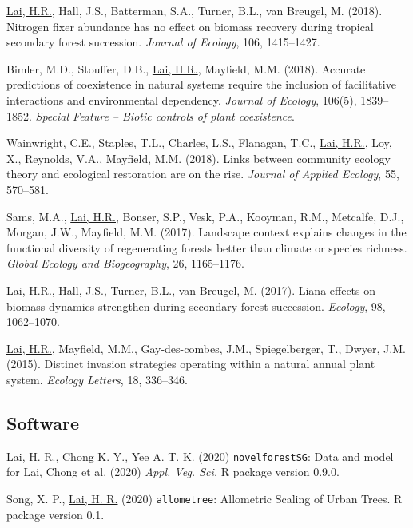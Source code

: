 \documentclass[a4paper]{article}
\begin{document}
\hangindent=1cm \underline{Lai, H.R.}, Hall, J.S., Batterman, S.A., Turner, B.L., van Breugel, M. (2018). Nitrogen fixer abundance has no effect on biomass recovery during tropical secondary forest succession. \textit{Journal of Ecology}, 106, 1415--1427.

\hangindent=1cm Bimler, M.D., Stouffer, D.B., \underline{Lai, H.R.}, Mayfield, M.M. (2018). Accurate predictions of coexistence in natural systems require the inclusion of facilitative interactions and environmental dependency. \textit{Journal of Ecology}, 106(5), 1839--1852. \textit{Special Feature -- Biotic controls of plant coexistence}.

\hangindent=1cm Wainwright, C.E., Staples, T.L., Charles, L.S., Flanagan, T.C., \underline{Lai, H.R.}, Loy, X., Reynolds, V.A., Mayfield, M.M. (2018). Links between community ecology theory and ecological restoration are on the rise. \textit{Journal of Applied Ecology}, 55, 570--581.

\hangindent=1cm Sams, M.A., \underline{Lai, H.R.}, Bonser, S.P., Vesk, P.A., Kooyman, R.M., Metcalfe, D.J., Morgan, J.W., Mayfield, M.M. (2017). Landscape context explains changes in the functional diversity of regenerating forests better than climate or species richness. \textit{Global Ecology and Biogeography}, 26, 1165--1176.

\hangindent=1cm \underline{Lai, H.R.}, Hall, J.S., Turner, B.L., van Breugel, M. (2017). Liana effects on biomass dynamics strengthen during secondary forest succession. \textit{Ecology}, 98, 1062--1070.

\hangindent=1cm \underline{Lai, H.R.}, Mayfield, M.M., Gay-des-combes, J.M., Spiegelberger, T., Dwyer, J.M. (2015). Distinct invasion strategies operating within a natural annual plant system. \textit{Ecology Letters}, 18, 336--346.

\subsection*{Software}
\hangindent=1cm \underline{Lai, H. R.}, Chong K. Y., Yee A. T. K. (2020) \texttt{novelforestSG}: Data and model for Lai, Chong et al. (2020) \textit{Appl. Veg. Sci.} R package version 0.9.0.

\hangindent=1cm Song, X. P., \underline{Lai, H. R.} (2020) \texttt{allometree}: Allometric Scaling of Urban Trees. R package version 0.1.
\end{document}
